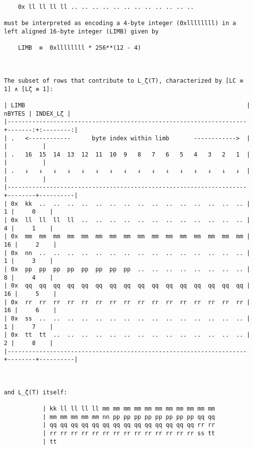 \documentclass[varwidth=\maxdimen,margin=0.5cm,multi={verbatim}]{standalone}
\begin{document}
\begin{verbatim}
    0x ll ll ll ll .. .. .. .. .. .. .. .. .. .. .. ..

must be interpreted as encoding a 4-byte integer (0xllllllll) in a left aligned 16-byte integer (LIMB) given by

    LIMB  ≡  0xllllllll * 256**(12 - 4)



The subset of rows that contribute to L_ζ(T), characterized by [LC ≡ 1] ∧ [Lζ ≡ 1]:

| LIMB                                                               | nBYTES | INDEX_Lζ |
|--------------------------------------------------------------------+-------:+:--------:|
| .   <------------      byte index within limb       ------------>  |        |          |
| .   16  15  14  13  12  11  10  9   8   7   6   5   4   3   2   1  |        |          |
| .   ↓   ↓   ↓   ↓   ↓   ↓   ↓   ↓   ↓   ↓   ↓   ↓   ↓   ↓   ↓   ↓  |        |          |
|--------------------------------------------------------------------+--------+----------|
| 0x  kk  ..  ..  ..  ..  ..  ..  ..  ..  ..  ..  ..  ..  ..  ..  .. |      1 |     0    |
| 0x  ll  ll  ll  ll  ..  ..  ..  ..  ..  ..  ..  ..  ..  ..  ..  .. |      4 |     1    |
| 0x  mm  mm  mm  mm  mm  mm  mm  mm  mm  mm  mm  mm  mm  mm  mm  mm |     16 |     2    |
| 0x  nn  ..  ..  ..  ..  ..  ..  ..  ..  ..  ..  ..  ..  ..  ..  .. |      1 |     3    |
| 0x  pp  pp  pp  pp  pp  pp  pp  pp  ..  ..  ..  ..  ..  ..  ..  .. |      8 |     4    |
| 0x  qq  qq  qq  qq  qq  qq  qq  qq  qq  qq  qq  qq  qq  qq  qq  qq |     16 |     5    |
| 0x  rr  rr  rr  rr  rr  rr  rr  rr  rr  rr  rr  rr  rr  rr  rr  rr |     16 |     6    |
| 0x  ss  ..  ..  ..  ..  ..  ..  ..  ..  ..  ..  ..  ..  ..  ..  .. |      1 |     7    |
| 0x  tt  tt  ..  ..  ..  ..  ..  ..  ..  ..  ..  ..  ..  ..  ..  .. |      2 |     8    |
|--------------------------------------------------------------------+--------+----------|



and L_ζ(T) itself:

           | kk ll ll ll ll mm mm mm mm mm mm mm mm mm mm mm
           | mm mm mm mm mm nn pp pp pp pp pp pp pp pp qq qq
           | qq qq qq qq qq qq qq qq qq qq qq qq qq qq rr rr
           | rr rr rr rr rr rr rr rr rr rr rr rr rr rr ss tt
           | tt
\end{verbatim}
\end{document}
